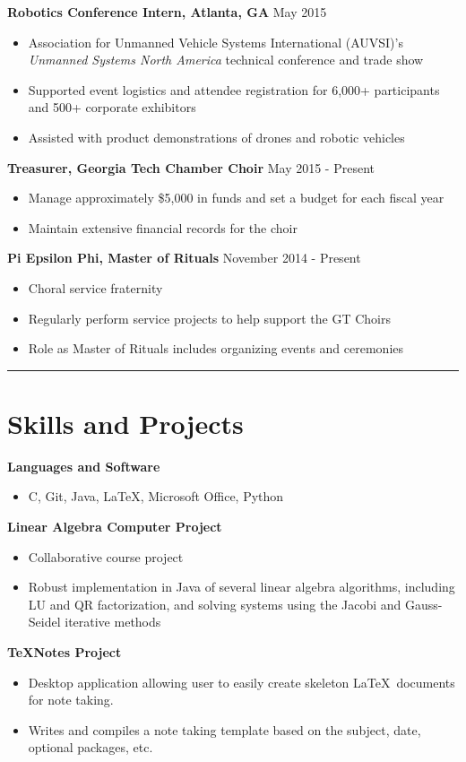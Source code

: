 \documentclass[11pt]{article}
\begin{document}
\textbf{Robotics Conference Intern, Atlanta, GA} \hfill May 2015
\begin{itemize}
\setlength\itemsep{0.5pt}
    \item Association for Unmanned Vehicle Systems International (AUVSI)'s \emph{Unmanned Systems North America} technical conference and trade show
    \item Supported event logistics and attendee registration for 6,000+ participants and 500+ corporate exhibitors
    \item Assisted with product demonstrations of drones and robotic vehicles
\end{itemize}

\textbf{Treasurer, Georgia Tech Chamber Choir} \hfill May 2015 - Present
\begin{itemize}
\setlength\itemsep{0.5pt}
    \item Manage approximately \$5,000 in funds and set a budget for each fiscal year
    \item Maintain extensive financial records for the choir
\end{itemize}

\textbf{Pi Epsilon Phi, Master of Rituals} \hfill November 2014 - Present
\begin{itemize}
\setlength\itemsep{0.5pt}
    \item Choral service fraternity
    \item Regularly perform service projects to help support the GT Choirs
    \item Role as Master of Rituals includes organizing events and ceremonies
\end{itemize}

\rule{\textwidth}{.5pt}

\section*{Skills and Projects}
\textbf{Languages and Software}
\begin{itemize}
\setlength\itemsep{0.5pt}
    \item C, Git, Java, \LaTeX, Microsoft Office, Python
\end{itemize}

\textbf{Linear Algebra Computer Project}
\begin{itemize}
\setlength\itemsep{0.5pt}
    \item Collaborative course project
    \item Robust implementation in Java of several linear algebra algorithms, including LU and QR factorization, and solving systems using the Jacobi and Gauss-Seidel iterative methods
\end{itemize}

\textbf{TeXNotes Project}
\begin{itemize}
\setlength\itemsep{0.5pt}
    \item Desktop application allowing user to easily create skeleton \LaTeX\ documents for note taking.
    \item Writes and compiles a note taking template based on the subject, date, optional packages, etc. 
\end{itemize}
\end{document}
